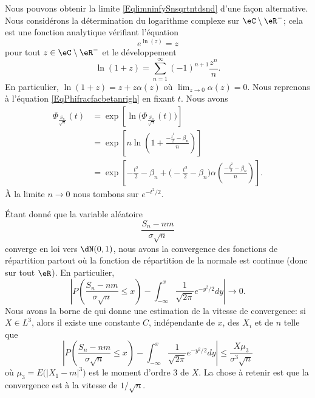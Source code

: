 \begin{remark}
    Nous pouvons obtenir la limite \eqref{EqlimninfySnsqrtntdsnd} d'une façon alternative. Nous considérons la détermination du logarithme complexe sur \( \eC\setminus\eR^-\); cela est une fonction analytique vérifiant l'équation
    \begin{equation}
        e^{\ln(z)}=z
    \end{equation}
    pour tout \( z\in\eC\setminus\eR^-\) et le développement
    \begin{equation}
        \ln(1+z)=\sum_{n=1}^{\infty}(-1)^{n+1}\frac{ z^n }{ n }.
    \end{equation}
    En particulier, \( \ln(1+z)=z+z\alpha(z)\) où \( \lim_{z\to 0}\alpha(z)=0\). Nous reprenons à l'équation \eqref{EqPhifracfacbetanrigh} en fixant \( t\). Nous avons
    \begin{subequations}
        \begin{align}
            \Phi_{\frac{ S_n }{ \sqrt{n} }}(t)&=\exp\left[ \ln\big(\Phi_{\frac{ S_n }{ \sqrt{n} }}(t)\big) \right]\\
            &=\exp\left[ n\ln\left( 1+\frac{ -\frac{ t^2 }{2}-\beta_n }{ n } \right) \right]\\
            &=\exp\left[ -\frac{ t^2 }{2}-\beta_n+ \big( -\frac{ t^2 }{2}-\beta_n \big)\alpha\left( \frac{ -\frac{ t^2 }{2}-\beta_n }{ n } \right) \right].
        \end{align}
    \end{subequations}
    À la limite \( n\to 0\) nous tombons sur \(  e^{-t^2/2}\).
    
\end{remark}

\begin{remark}
    Étant donné que la variable aléatoire 
    \begin{equation}
        \frac{ S_n-nm }{ \sigma\sqrt{n} }
    \end{equation}
    converge en loi vers \( \dN(0,1)\), nous avons la convergence des fonctions de répartition partout où la fonction de répartition de la normale est continue (donc sur tout \( \eR\)). En particulier,
    \begin{equation}
        \left| P\left( \frac{ S_n-nm }{ \sigma\sqrt{n} }\leq x \right)-\int_{-\infty}^x\frac{1}{ \sqrt{2\pi} } e^{-y^2/2}dy \right| \to 0.
    \end{equation}
    Nous avons la borne de  qui donne une estimation de la vitesse de convergence: si \( X\in L^3\), alors  il existe une constante \( C\), indépendante de \( x\), des \( X_i\) et de \( n\) telle que
    \begin{equation}
        \left| P\left( \frac{ S_n-nm }{ \sigma\sqrt{n} }\leq x \right)-\int_{-\infty}^x\frac{1}{ \sqrt{2\pi} } e^{-y^2/2}dy \right| \leq\frac{ X\mu_3 }{ \sigma^3\sqrt{n} }
    \end{equation}
    où \( \mu_3=E\big( | X_1-m |^3 \big)\) est le moment d'ordre \( 3\) de \( X\). La chose à retenir est que la convergence est à la vitesse de \( 1/\sqrt{n}\).
\end{remark}

